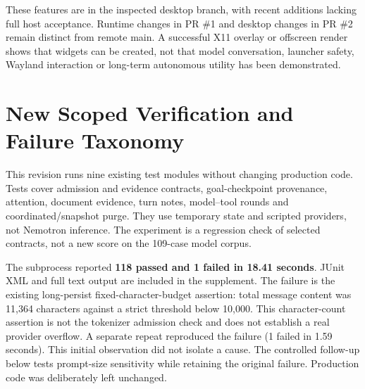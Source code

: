 \documentclass[11pt,a4paper]{article}
\begin{document}
These features are in the inspected desktop branch, with recent additions lacking full host acceptance. Runtime changes in PR \#1 and desktop changes in PR \#2 remain distinct from remote main. A successful X11 overlay or offscreen render shows that widgets can be created, not that model conversation, launcher safety, Wayland interaction or long-term autonomous utility has been demonstrated.


\section{New Scoped Verification and Failure Taxonomy}\label{sec:newchecks}
This revision runs nine existing test modules without changing production code. Tests cover admission and evidence contracts, goal-checkpoint provenance, attention, document evidence, turn notes, model--tool rounds and coordinated/snapshot purge. They use temporary state and scripted providers, not Nemotron inference. The experiment is a regression check of selected contracts, not a new score on the 109-case model corpus.

The subprocess reported \textbf{118 passed and 1 failed in 18.41 seconds}. JUnit XML and full text output are included in the supplement. The failure is the existing long-persist fixed-character-budget assertion: total message content was 11,364 characters against a strict threshold below 10,000. This character-count assertion is not the tokenizer admission check and does not establish a real provider overflow. A separate repeat reproduced the failure (1 failed in 1.59 seconds). This initial observation did not isolate a cause. The controlled follow-up below tests prompt-size sensitivity while retaining the original failure. Production code was deliberately left unchanged.
\end{document}
